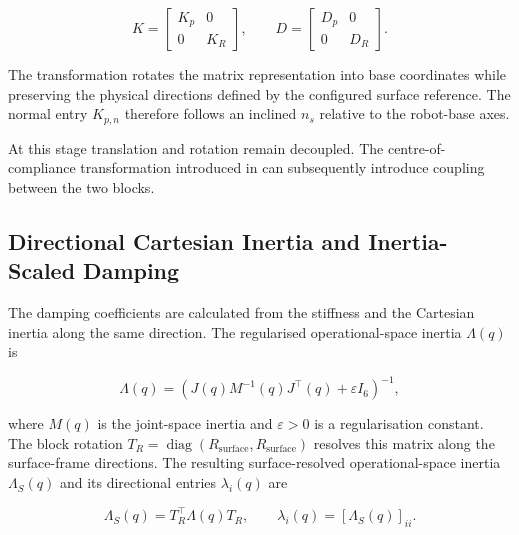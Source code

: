 \begin{equation}
K
=
\begin{bmatrix}
K_p & 0\\
0 & K_R
\end{bmatrix},
\qquad
D
=
\begin{bmatrix}
D_p & 0\\
0 & D_R
\end{bmatrix}.
\label{eq:full_task_frame_gain_transform}
\end{equation}

The transformation rotates the matrix representation into base coordinates
while preserving the physical directions defined by the configured surface
reference. The normal entry \mbox{\(K_{p,n}\)} therefore follows an inclined
\mbox{\(n_s\)} relative to the robot-base axes.

At this stage translation and rotation remain decoupled. The
centre-of-compliance transformation introduced in
\mbox{} can subsequently introduce coupling
between the two blocks.

\subsection{Directional Cartesian Inertia and Inertia-Scaled Damping}
\label{subsec:inertia_scaled_damping_calculation}

The damping coefficients are calculated from the stiffness and the Cartesian
inertia along the same direction. The regularised operational-space inertia \mbox{\(\Lambda(q)\)} is

\begin{equation}
\Lambda(q)
=
\left(J(q)M^{-1}(q)J^\top(q)+\varepsilon I_6\right)^{-1},
\label{eq:directional_cartesian_inertia_base}
\end{equation}

where \mbox{\(M(q)\)} is the joint-space inertia and
\mbox{\(\varepsilon>0\)} is a regularisation constant. The block rotation
\mbox{\(T_R=\operatorname{diag}(R_{\mathrm{surface}},R_{\mathrm{surface}})\)}
resolves this matrix along the surface-frame directions. The resulting
surface-resolved operational-space inertia \mbox{\(\Lambda_S(q)\)} and its
directional entries \mbox{\(\lambda_i(q)\)} are

\begin{equation}
\Lambda_S(q)
=
T_R^\top\Lambda(q)T_R,
\qquad
\lambda_i(q)=\left[\Lambda_S(q)\right]_{ii}.
\label{eq:directional_cartesian_inertia}
\end{equation}

